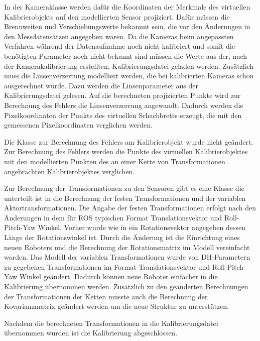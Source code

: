 In der Kameraklasse werden dafür die Koordinaten der Merkmale des virtuellen 
Kalibrierobjekts auf den modellierten Sensor projiziert. Dafür müssen die
Brennweiten und Verschiebungswerte bekannnt sein, die vor den Änderungen in den
Messdatensätzen angegeben waren. Da die Kameras beim angepassten Verfahren 
während der Datenaufnahme noch nicht kalibriert und somit die benötigten 
Parameter noch nicht bekannt sind müssen die Werte aus der, nach der
Kamerakalibrierung erstellten, Kalibrierungsdatei geladen werden. 
Zusätzlich muss die Linsenverzerrung modelliert werden, die bei kalibrierten 
Kameras schon ausgerechnet wurde. Dazu werden die Linsenparameter aus der 
Kalibrierungsdatei gelesen. Auf die berechneten projizierten Punkte wird zur 
Berechnung des Fehlers die Linsenverzerrung angewandt. Dadurch werden
die Pixelkoordinaten der Punkte des virtuellen Schachbretts erzeugt, die mit 
den gemessenen Pixelkoordinaten verglichen werden.

Die Klasse zur Berechnung des Fehlers am Kalibrierobjekt wurde nicht geändert.
Zur Berechnung des Fehlers werden die Punkte des virtuellen Kalibrierobjektes
mit den modellierten Punkten des an einer Kette von Transformationen angebrachten
Kalibrierobjektes verglichen.

Zur Berechnung der Transformationen zu den Sensoren gibt es eine Klasse die 
unterteilt ist in die Berechnung der festen Transformationen und der variablen
Aktortransformationen. Die Angabe der festen Transformationen erfolgt nach den
Änderungen in dem für \ac{ROS} typischen Format Translationsvektor und
Roll-Pitch-Yaw Winkel. Vorher wurde wie in \cite[Abschnitt 3.3.2]{pr2_estimation}
ein Rotationsvektor angegeben dessen Länge der Rotationswinkel ist. 
Durch die Änderung ist die Einrichtung eines neuen Roboters und die Berechnung
der Rotationsmatrix im Modell vereinfacht worden. 
Das Modell der variablen Transformationen wurde von \ac{DH-Parameter}n zu
gegebenen Transformationen im Format Translationsvektor und 
Roll-Pitch-Yaw Winkel geändert. Dadurch können neue Roboter einfacher in die 
Kalibrierung übernommen werden. 
Zusätzlich zu den geänderten Berechnungen der Transformationen der Ketten musste
auch die Berechnung der Kovarianzmatrix geändert werden um die neue Struktur zu 
unterstützen. 

Nachdem die berechneten Transformationen in die Kalibrierungsdatei übernommen 
wurden ist die Kalibrierung abgeschlossen.

